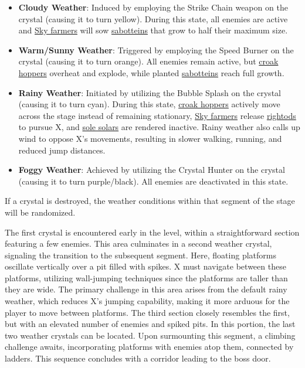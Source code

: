 \begin{itemize}
\item \textbf{Cloudy Weather}: Induced by employing the Strike Chain weapon on the crystal (causing it to turn yellow). During this state, all enemies are active and \hyperlink{enem:Sky_Farmer}{Sky farmers} will sow \hyperlink{enem:Sabottein}{sabotteins} that grow to half their maximum size.

\item \textbf{Warm/Sunny Weather}: Triggered by employing the Speed Burner on the crystal (causing it to turn orange). All enemies remain active, but \hyperlink{enem:Croak_hopper}{croak hoppers} overheat and explode, while planted \hyperlink{enem:Sabottein}{sabotteins} reach full growth.

\item \textbf{Rainy Weather}: Initiated by utilizing the Bubble Splash on the crystal (causing it to turn cyan). During this state, \hyperlink{enem:Croak_hopper}{croak hoppers} actively move across the stage instead of remaining stationary, \hyperlink{enem:Sky_Farmer}{Sky farmers} release \hyperlink{enem:Rightod}{rightods} to pursue X, and \hyperlink{enem:Sole_solar}{sole solars} are rendered inactive. Rainy weather also calls up wind to oppose X's movements, resulting in slower walking, running, and reduced jump distances.

\item \textbf{Foggy Weather}: Achieved by utilizing the Crystal Hunter on the crystal (causing it to turn purple/black). All enemies are deactivated in this state.
\end{itemize}

If a crystal is destroyed, the weather conditions within that segment of the stage will be randomized.

The first crystal is encountered early in the level, within a straightforward section featuring a few enemies. This area culminates in a second weather crystal, signaling the transition to the subsequent segment. Here, floating platforms oscillate vertically over a pit filled with spikes. X must navigate between these platforms, utilizing wall-jumping techniques since the platforms are taller than they are wide. The primary challenge in this area arises from the default rainy weather, which reduces X's jumping capability, making it more arduous for the player to move between platforms. The third section closely resembles the first, but with an elevated number of enemies and spiked pits. In this portion, the last two weather crystals can be located. Upon surmounting this segment, a climbing challenge awaits, incorporating platforms with enemies atop them, connected by ladders. This sequence concludes with a corridor leading to the boss door.

